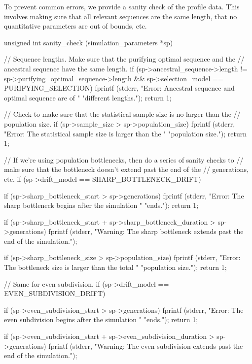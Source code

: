 \documentclass{article}
\begin{document}
     To prevent common errors, we provide a sanity check of the profile data.
     This involves making sure that all relevant sequences are the same length,
     that no quantitative parameters are out of bounds, etc.

\begin{ccode}
unsigned int sanity_check (simulation_parameters *sp) {
  // Sequence lengths. Make sure that the purifying optimal sequence and the
  // ancestral sequence have the same length.
  if (sp->ancestral_sequence->length != sp->purifying_optimal_sequence->length &&
      sp->selection_model == PURIFYING_SELECTION) {
    fprintf (stderr, "Error: Ancestral sequence and optimal sequence are of "
                 "different lengths.\n");
    return 1;
  }

  // Check to make sure that the statistical sample size is no larger than the
  // population size.
  if (sp->sample_size > sp->population_size) {
    fprintf (stderr, "Error: The statistical sample size is larger than the "
                 "population size.\n");
    return 1;
  }

  // If we’re using population bottlenecks, then do a series of sanity checks to
  // make sure that the bottleneck doesn’t extend past the end of the
  // generations, etc.
  if (sp->drift_model == SHARP_BOTTLENECK_DRIFT) {
    if (sp->sharp_bottleneck_start > sp->generations) {
      fprintf (stderr, "Error: The sharp bottleneck begins after the simulation "
                   "ends.\n");
      return 1;
    }

    if (sp->sharp_bottleneck_start + sp->sharp_bottleneck_duration > sp->generations)
      fprintf (stderr, "Warning: The sharp bottleneck extends past the end of the simulation.\n");

    if (sp->sharp_bottleneck_size > sp->population_size) {
      fprintf (stderr, "Error: The bottleneck size is larger than the total "
                   "population size.\n");
      return 1;
    }
  }

  // Same for even subdivision.
  if (sp->drift_model == EVEN_SUBDIVISION_DRIFT) {
    if (sp->even_subdivision_start > sp->generations) {
      fprintf (stderr, "Error: The even subdivision begins after the simulation "
                   "ends.\n");
      return 1;
    }

    if (sp->even_subdivision_start + sp->even_subdivision_duration > sp->generations)
      fprintf (stderr, "Warning: The even subdivision extends past the end of the simulation.\n");

}}
\end{ccode}
\end{document}
